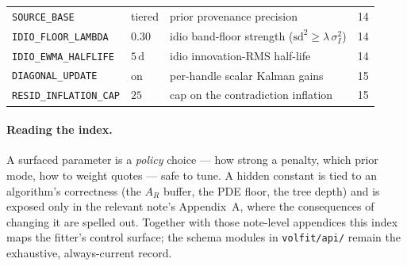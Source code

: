 \documentclass[11pt]{article}
\begin{document}
\begin{longtable}{p{}p{}p{}r}
\texttt{SOURCE\_BASE} & tiered & prior provenance precision & 14\\
\texttt{IDIO\_FLOOR\_LAMBDA} & $0.30$ & idio band-floor strength
($\mathrm{sd}^2 \ge \lambda\,\sigma_I^2$) & 14\\
\texttt{IDIO\_EWMA\_HALFLIFE} & $5$\,d & idio innovation-RMS half-life & 14\\
\texttt{DIAGONAL\_UPDATE} & on & per-handle scalar Kalman gains & 15\\
\texttt{RESID\_INFLATION\_CAP} & $25$ & cap on the contradiction inflation & 15\\
\bottomrule
\end{longtable}

\normalsize
\paragraph{Reading the index.} A surfaced parameter is a \emph{policy} choice ---
how strong a penalty, which prior mode, how to weight quotes --- safe to tune. A
hidden constant is tied to an algorithm's correctness (the $A_R$ buffer, the PDE
floor, the tree depth) and is exposed only in the relevant note's Appendix~A,
where the consequences of changing it are spelled out. Together with those
note-level appendices this index maps the fitter's control surface; the schema
modules in \texttt{volfit/api/} remain the exhaustive, always-current record.
\end{document}
